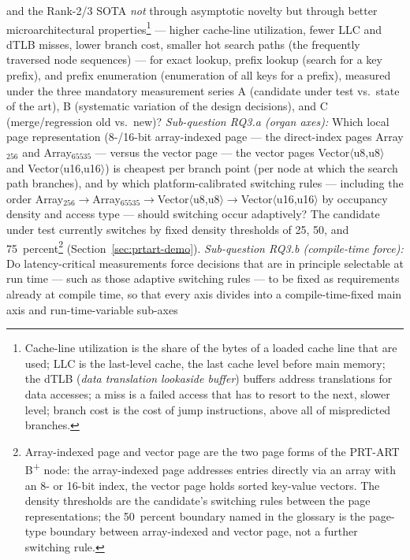 \begin{description}
  and the Rank-2/3 SOTA \emph{not} through asymptotic novelty but through better
  microarchitectural properties\footnote{Cache-line utilization is the share of the bytes of a loaded
  cache line that are used; LLC is the last-level cache, the last cache level before
  main memory; the dTLB (\emph{data translation lookaside buffer}) buffers address translations for
  data accesses; a miss is a failed access that has to resort to the next, slower level; branch cost
  is the cost of jump instructions, above all of mispredicted branches.} --- higher
  cache-line utilization, fewer LLC and dTLB misses, lower branch cost, smaller hot
  search paths (the frequently traversed node sequences) --- for exact lookup, prefix lookup (search for
  a key prefix), and prefix enumeration (enumeration of all keys for a prefix),
  measured under the three mandatory measurement series A (candidate under test vs.\ state of the
  art), B (systematic variation of the design decisions), and C (merge/regression old vs.\
  new)? \emph{Sub-question RQ3.a (organ axes):} Which local page representation (8-/16-bit array-indexed page ---
  the direct-index pages Array$_{256}$ and Array$_{65535}$ --- versus the vector page --- the
  vector pages Vector$\langle$u8,u8$\rangle$ and Vector$\langle$u16,u16$\rangle$) is cheapest per
  branch point (per node at which the search path branches), and by which
  platform-calibrated
  switching rules --- including the order
  Array$_{256}\to$Array$_{65535}\to$Vector$\langle$u8,u8$\rangle\to$Vector$\langle$u16,u16$\rangle$
  by occupancy density and access type --- should switching occur adaptively?
  The candidate under test currently switches by fixed
  density thresholds of 25, 50, and 75~percent\footnote{Array-indexed page and vector page are the two
  page forms of the PRT-ART B\textsuperscript{+} node: the array-indexed page addresses entries directly via an array with an 8-
  or 16-bit index, the vector page holds sorted key-value vectors. The density thresholds
  are the candidate's switching rules between the page representations; the 50~percent boundary named in the
  glossary is the page-type boundary between array-indexed and vector page, not a further
  switching rule.} (Section~\ref{sec:prtart-demo}).
  \emph{Sub-question RQ3.b (compile-time force):} Do latency-critical measurements force decisions that are
  in principle selectable at run time --- such as those adaptive switching rules --- to be
  fixed as requirements already at compile time, so that every axis divides into a
  compile-time-fixed main axis and run-time-variable sub-axes

\end{description}
